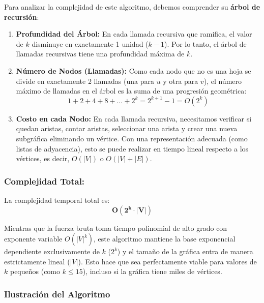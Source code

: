 Para analizar la complejidad de este algoritmo, debemos comprender su \textbf{árbol de recursión}:

\begin{enumerate}
    \item \textbf{Profundidad del Árbol:} En cada llamada recursiva que ramifica, el valor de $k$ disminuye en exactamente 1 unidad ($k-1$). Por lo tanto, el árbol de llamadas recursivas tiene una profundidad máxima de \textbf{$k$}.
    \item \textbf{Número de Nodos (Llamadas):} Como cada nodo que no es una hoja se divide en exactamente 2 llamadas (una para $u$ y otra para $v$), el número máximo de llamadas en el árbol es la suma de una progresión geométrica:
    \[ 1 + 2 + 4 + 8 + \dots + 2^k = 2^{k+1} - 1 = O(2^k) \]
    \item \textbf{Costo en cada Nodo:} En cada llamada recursiva, necesitamos verificar si quedan aristas, contar aristas, seleccionar una arista y crear una nueva subgráfica eliminando un vértice. Con una representación adecuada (como listas de adyacencia), esto se puede realizar en tiempo lineal respecto a los vértices, es decir, \textbf{$O(|V|)$} o $O(|V| + |E|)$.
\end{enumerate}

\subsubsection*{Complejidad Total:}
La complejidad temporal total es:
\[ \mathbf{O(2^k \cdot |V|)} \]

Mientras que la fuerza bruta toma tiempo polinomial de alto grado con exponente variable $O(|V|^k)$, este algoritmo mantiene la base exponencial dependiente exclusivamente de $k$ ($2^k$) y el tamaño de la gráfica entra de manera estrictamente lineal ($|V|$). Esto hace que sea perfectamente viable para valores de $k$ pequeños (como $k \le 15$), incluso si la gráfica tiene miles de vértices.

\subsubsection*{Ilustración del Algoritmo}


